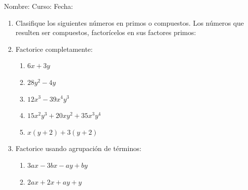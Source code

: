 \documentclass[letterpaper,fleqn]{article}
\newcommand{\LineaNombre}{%
\par
\vspace{\baselineskip}
Nombre:\hrulefill \; Curso: \underline{\hspace*{48pt}} \; Fecha: \underline{\hspace*{2.5cm}} \relax
\par}
\begin{document}
\LineaNombre
\begin{enumerate}
 \item Clasifique los siguientes números en primos o compuestos. Los números que resulten ser compuestos, factorícelos en sus factores primos:
 \begin{enumerate}
 \end{enumerate}
 \item Factorice completamente:
 \begin{enumerate}
 \item $6x+3y$
 \item $28y^{2}-4y$
 \item $12x^{3}-39x^{4}y^{3}$
 \item $15x^{2}y^{3}+20xy^{2}+35x^{3}y^{4}$
 \item $x(y+2)+3(y+2)$
 \end{enumerate}
 \item Factorice usando agrupación de términos:
 \begin{enumerate}
 \item $3ax-3bx-ay+by$
 \item $2ax+2x+ay+y$
 \end{enumerate}
 \end{enumerate}
\end{document}
